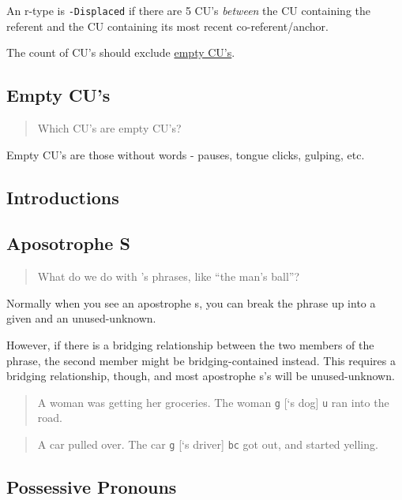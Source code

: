 \documentclass[
]{book}
\begin{document}
An r-type is \texttt{-Displaced} if there are 5 CU's \emph{between} the CU containing the referent and the CU containing its most recent co-referent/anchor.

The count of CU's should exclude \href{empty-cu's}{empty CU's}.

\hypertarget{empty-cus}{%
\subsection{Empty CU's}\label{empty-cus}}

\begin{quote}
Which CU's are empty CU's?
\end{quote}

Empty CU's are those without words - pauses, tongue clicks, gulping, etc.

\hypertarget{introductions}{%
\subsection{Introductions}\label{introductions}}

\hypertarget{aposotrophe-s}{%
\subsection{Aposotrophe S}\label{aposotrophe-s}}

\begin{quote}
What do we do with 's phrases, like ``the man's ball''?
\end{quote}

Normally when you see an apostrophe s, you can break the phrase up into a given and an unused-unknown.

However, if there is a bridging relationship between the two members of the phrase, the second member might be bridging-contained instead.
This requires a bridging relationship, though, and most apostrophe s's will be unused-unknown.

\begin{quote}
A woman was getting her groceries.
The woman \texttt{g} {[}`s dog{]} \texttt{u} ran into the road.
\end{quote}

\begin{quote}
A car pulled over.
The car \texttt{g} {[}`s driver{]} \texttt{bc} got out, and started yelling.
\end{quote}

\hypertarget{possessive-pronouns}{%
\subsection{Possessive Pronouns}\label{possessive-pronouns}}
\end{document}

